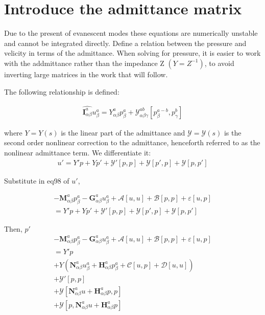 \documentclass{Note}
\begin{document}
\section{Introduce the admittance matrix}

Due to the present of evanescent modes these equations are numerically unstable and cannot be integrated directly. Define a relation between the pressure and velicity in terms of the admittance. When solving for pressure, it is easier to work with the addmittance rather than the impedance Z $(Y=Z^{-1})$, to avoid inverting large matrices in the work that will follow.

The following relationship is defined:

\begin{equation}
\begin{aligned}
\widehat{\textbf{I}_{\alpha\beta}^a}  u_{\beta}^a=Y_{\alpha\beta}^a p_{\beta}^a+\mathcal{Y}_{\alpha\beta\gamma}^{ab}[p_{\beta}^{a-b},p_{\gamma}^{b}]
\end{aligned}
\end{equation}

where $Y=Y(s)$ is the linear part of the admittance and $\mathcal{Y}=\mathcal{Y}(s)$ is the second order nonlinear correction to the admittance, henceforth referred to as the  nonlinear admittance term. We differentiate it:
\begin{equation}
\begin{aligned}
u'=Y'p+Yp'+\mathcal{Y}'[p,p]+\mathcal{Y}[p',p]+\mathcal{Y}[p,p']
\end{aligned}
\end{equation}

Substitute in eq98 of $u'$,

 \begin{equation}
\begin{aligned}
-\textbf{M}_{\alpha\beta}^a p_\beta^a - \textbf{G}_{\alpha\beta}^a u_\beta^a+\mathcal{A}[u,u]+\mathcal{B}[p,p]+\varepsilon[u,p]\\=Y'p+Yp'+\mathcal{Y}'[p,p]+\mathcal{Y}[p',p]+\mathcal{Y}[p,p']
\end{aligned}
\end{equation}

Then, $p'$
 \begin{equation}
\begin{aligned}
-\textbf{M}_{\alpha\beta}^a p_\beta^a - \textbf{G}_{\alpha\beta}^a u_\beta^a+\mathcal{A}[u,u]+\mathcal{B}[p,p]+\varepsilon[u,p]\\=Y'p\\
+Y(\textbf{N}_{\alpha\beta}^a u_\beta^a+\textbf{H}_{\alpha\beta}^a p_\beta^a+\mathcal{C}[u,p]+\mathcal{D}[u,u])\\+\mathcal{Y}'[p,p]\\
+\mathcal{Y}[\textbf{N}_{\alpha\beta}^a u+\textbf{H}_{\alpha\beta}^a p,p]\\
+\mathcal{Y}[p,\textbf{N}_{\alpha\beta}^a u+\textbf{H}_{\alpha\beta}^a p]
\end{aligned}
\end{equation}
\end{document}
